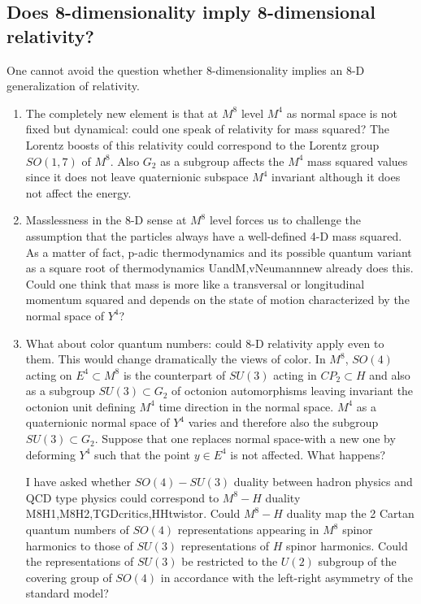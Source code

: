 \documentclass[10pt,epsf]{article}
\begin{document}
{\begin{enumerate}
\end{enumerate}


\subsection{Does 8-dimensionality imply 8-dimensional relativity?}

One cannot avoid the question whether 8-dimensionality implies an 8-D generalization of relativity.


\begin{enumerate}

\item    The completely new element is that at $M^8$ level $M^4$  as normal space is not fixed but dynamical: could one speak  of relativity for mass squared? The Lorentz boosts of this relativity could correspond to the Lorentz group $SO(1,7)$  of $M^8$. Also  $G_2$ as a subgroup affects the $M^4$  mass squared values since it does not leave quaternionic subspace  $M^4$ invariant although it does not affect the energy.

\item Masslessness in the 8-D sense at $M^8$ level forces us to challenge the assumption that the particles always have a well-defined  4-D mass squared. As a matter of fact, p-adic thermodynamics and its possible quantum variant as a square root of thermodynamics \cite{allb}{UandM,vNeumannnew}  already does this. Could one think that mass is more like a transversal or longitudinal momentum squared and  depends on the state of motion characterized by the normal space of $Y^4$?

\item What about color quantum numbers: could 8-D relativity apply even to them.  This would change dramatically the views of color. In $M^8$,  $SO(4)$ acting on $E^4\subset M^8$ is the counterpart of $SU(3)$ acting in $CP_2\subset H$ and also as a  subgroup $SU(3)\subset G_2$ of octonion automorphisms leaving invariant the octonion unit  defining $M^4$ time direction in the normal space.  $M^4$ as a quaternionic normal space  of $Y^4$ varies and therefore also the subgroup $SU(3)\subset G_2$.  Suppose that one replaces normal space-with a new one by deforming $Y^4$ such that the point $y\in E^4$ is not affected. What happens?

I have asked whether  $SO(4)-SU(3)$ duality  between hadron physics and QCD type physics  could correspond to $M^8-H$ duality \cite{btart}{M8H1,M8H2,TGDcritics,HHtwistor}.  Could $M^8-H$ duality map  the 2 Cartan quantum numbers of $SO(4)$ representations  appearing in  $M^8$ spinor harmonics  to those of $SU(3)$ representations of $H$ spinor harmonics. Could the representations of $SU(3)$ be restricted to the $U(2)$ subgroup of  the covering group of $SO(4)$ in accordance with the left-right asymmetry of the standard model? 


\end{enumerate}}
\end{document}
